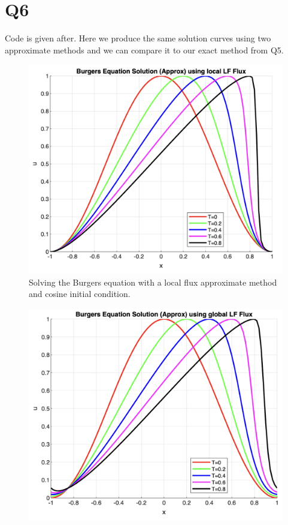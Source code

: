 \pagebreak

\section*{Q6}
\begin{solution}
\hfill\break
Code is given after. Here we produce the same solution curves using two approximate methods and we can compare it to our exact method from Q5.
\begin{figure}[H]
    \centering
    \includegraphics[scale=0.4]{./figures/q6-cos-local.png}
    \caption{Solving the Burgers equation with a local flux approximate method and cosine initial condition.}
\end{figure}
\begin{figure}[H]
    \centering
    \includegraphics[scale=0.4]{./figures/q6-cos-global.png}

\end{figure}
\end{solution}
